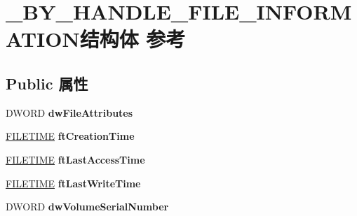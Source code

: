 \hypertarget{struct___b_y___h_a_n_d_l_e___f_i_l_e___i_n_f_o_r_m_a_t_i_o_n}{}\section{\+\_\+\+B\+Y\+\_\+\+H\+A\+N\+D\+L\+E\+\_\+\+F\+I\+L\+E\+\_\+\+I\+N\+F\+O\+R\+M\+A\+T\+I\+O\+N结构体 参考}
\label{struct___b_y___h_a_n_d_l_e___f_i_l_e___i_n_f_o_r_m_a_t_i_o_n}
\subsection*{Public 属性}
\begin{DoxyCompactItemize}
\item 
\mbox{\label{struct___b_y___h_a_n_d_l_e___f_i_l_e___i_n_f_o_r_m_a_t_i_o_n_ad3584cd6609134167f89f2c8b13fa711}} 
D\+W\+O\+RD {\bfseries dw\+File\+Attributes}
\item 
\mbox{\label{struct___b_y___h_a_n_d_l_e___f_i_l_e___i_n_f_o_r_m_a_t_i_o_n_a15e340d6fdc1a3ca952d1b3a1993ef26}} 
\hyperlink{struct___f_i_l_e_t_i_m_e}{F\+I\+L\+E\+T\+I\+ME} {\bfseries ft\+Creation\+Time}
\item 
\mbox{\label{struct___b_y___h_a_n_d_l_e___f_i_l_e___i_n_f_o_r_m_a_t_i_o_n_aced425c7e357a5b13963a8a4910e19ef}} 
\hyperlink{struct___f_i_l_e_t_i_m_e}{F\+I\+L\+E\+T\+I\+ME} {\bfseries ft\+Last\+Access\+Time}
\item 
\mbox{\label{struct___b_y___h_a_n_d_l_e___f_i_l_e___i_n_f_o_r_m_a_t_i_o_n_ab25aa6f9c0331b720fbf191231a77405}} 
\hyperlink{struct___f_i_l_e_t_i_m_e}{F\+I\+L\+E\+T\+I\+ME} {\bfseries ft\+Last\+Write\+Time}
\item 
\mbox{\label{struct___b_y___h_a_n_d_l_e___f_i_l_e___i_n_f_o_r_m_a_t_i_o_n_af4e42d7b7481b0a4af4c1adb7abdc511}} 
D\+W\+O\+RD {\bfseries dw\+Volume\+Serial\+Number}
\item 

\end{DoxyCompactItemize}
